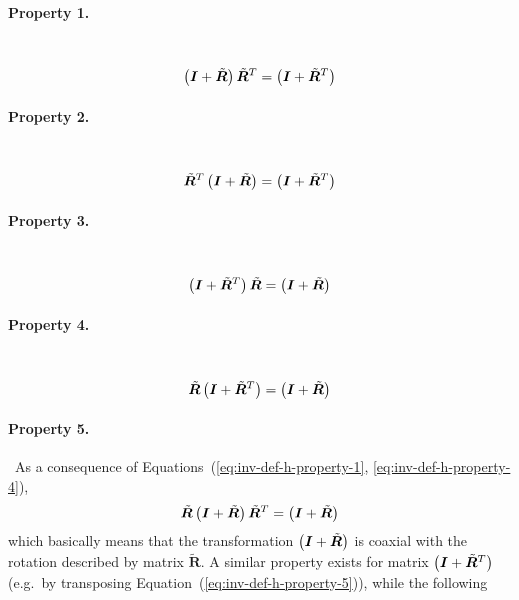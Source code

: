 \documentclass[10pt,dvips,fleqn,subeqn]{report}
\newcommand{\T}[1]{\bm{#1}}
\begin{document}
\paragraph{Property 1.} \
\begin{equation}
	\plbr{\T{I} + \tilde{\T{R}}} \tilde{\T{R}}^T = \plbr{\T{I} + \tilde{\T{R}}^T}
	\label{eq:inv-def-h-property-1}
\end{equation}

\paragraph{Property 2.} \
\begin{equation}
	\tilde{\T{R}}^T \plbr{\T{I} + \tilde{\T{R}}} = \plbr{\T{I} + \tilde{\T{R}}^T}
	\label{eq:inv-def-h-property-2}
\end{equation}

\paragraph{Property 3.} \
\begin{equation}
	\plbr{\T{I} + \tilde{\T{R}}^T} \tilde{\T{R}} = \plbr{\T{I} + \tilde{\T{R}}}
	\label{eq:inv-def-h-property-3}
\end{equation}

\paragraph{Property 4.} \
\begin{equation}
	\tilde{\T{R}} \plbr{\T{I} + \tilde{\T{R}}^T} = \plbr{\T{I} + \tilde{\T{R}}}
	\label{eq:inv-def-h-property-4}
\end{equation}

\paragraph{Property 5.} \
As a consequence
of Equations~(\ref{eq:inv-def-h-property-1}, \ref{eq:inv-def-h-property-4}),
\begin{equation}
	\tilde{\T{R}} \plbr{\T{I} + \tilde{\T{R}}} \tilde{\T{R}}^T = \plbr{\T{I} + \tilde{\T{R}}}
	\label{eq:inv-def-h-property-5}
\end{equation}
which basically means that the transformation $\plbr{\T{I} + \tilde{\T{R}}}$
is coaxial with the rotation described by matrix $\tilde{\T{R}}$.
A similar property exists for matrix $\plbr{\T{I} + \tilde{\T{R}}^T}$
(e.g.\ by transposing Equation~(\ref{eq:inv-def-h-property-5})),
while the following
\end{document}
